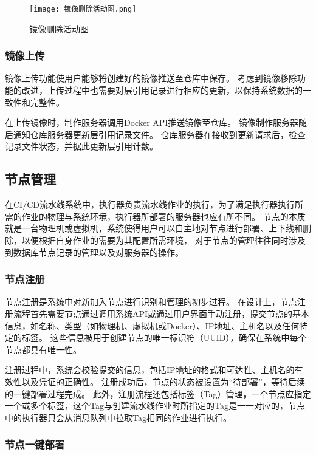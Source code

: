 \begin{figure}[H]
  \centering
  \texttt{[image: 镜像删除活动图.png]}
  \caption{镜像删除活动图}
  \label{fig:镜像删除活动图}
\end{figure}

\subsubsection{镜像上传}
镜像上传功能使用户能够将创建好的镜像推送至仓库中保存。
考虑到镜像移除功能的改进，上传过程中也需要对层引用记录进行相应的更新，以保持系统数据的一致性和完整性。

在上传镜像时，制作服务器调用Docker API推送镜像至仓库。
镜像制作服务器随后通知仓库服务器更新层引用记录文件。
仓库服务器在接收到更新请求后，检查记录文件状态，并据此更新层引用计数。

\subsection{节点管理}
在CI/CD流水线系统中，执行器负责流水线作业的执行，为了满足执行器执行所需的作业的物理与系统环境，执行器所部署的服务器也应有所不同。
节点的本质就是一台物理机或虚拟机，系统使得用户可以自主地对节点进行部署、上下线和删除，以便根据自身作业的需要为其配置所需环境，
对于节点的管理往往同时涉及到数据库节点记录的管理以及对服务器的操作。

\subsubsection{节点注册}
节点注册是系统中对新加入节点进行识别和管理的初步过程。
在设计上，节点注册流程首先需要节点通过调用系统API或通过用户界面手动注册，提交节点的基本信息，如名称、类型（如物理机、虚拟机或Docker）、IP地址、主机名以及任何特定的标签。
这些信息被用于创建节点的唯一标识符（UUID），确保在系统中每个节点都具有唯一性。

注册过程中，系统会校验提交的信息，包括IP地址的格式和可达性、主机名的有效性以及凭证的正确性。
注册成功后，节点的状态被设置为“待部署”，等待后续的一键部署过程完成。
此外，注册流程还包括标签（Tag）管理，一个节点应指定一个或多个标签，这个Tag与创建流水线作业时所指定的Tag是一一对应的，节点中的执行器只会从消息队列中拉取Tag相同的作业进行执行。

\subsubsection{节点一键部署}

